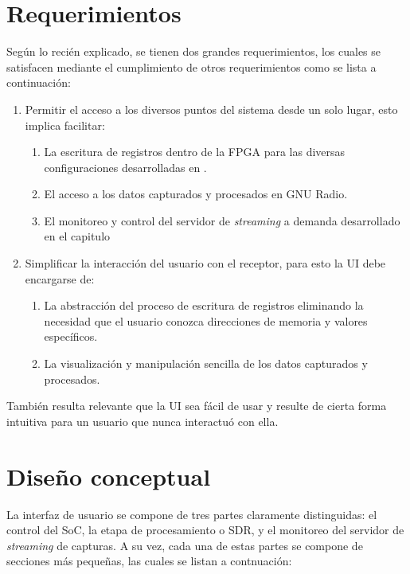 \documentclass[../../main.tex]{subfiles}
\begin{document}
\section{Requerimientos}
Según lo recién explicado, se tienen dos grandes requerimientos, los cuales se satisfacen mediante el cumplimiento de otros requerimientos como se lista a continuación:
\begin{enumerate}
    \item Permitir el acceso a los diversos puntos del sistema desde un solo lugar, esto implica facilitar:
    \begin{enumerate}
        \item La escritura de registros dentro de la FPGA para las diversas configuraciones desarrolladas en .
        \item El acceso a los datos capturados y procesados en GNU Radio.
        \item El monitoreo y control del servidor de \textit{streaming} a demanda desarrollado en el capitulo 
    \end{enumerate}
    \item Simplificar la interacción del usuario con el receptor, para esto la UI debe encargarse de:
    \begin{enumerate}
        \item La abstracción del proceso de escritura de registros eliminando la necesidad que el usuario conozca direcciones de memoria y valores específicos.
        \item La visualización y manipulación sencilla de los datos capturados y procesados.
    \end{enumerate}
\end{enumerate}

También resulta relevante que la UI sea fácil de usar y resulte de cierta forma intuitiva para un usuario que nunca interactuó con ella.

\section{Diseño conceptual}\label{sec::disenio-conceptual}
La interfaz de usuario se compone de tres partes claramente distinguidas: el control del SoC, la etapa de procesamiento o SDR, y el monitoreo del servidor de \textit{streaming} de capturas. A su vez, cada una de estas partes se compone de secciones más pequeñas, las cuales se listan a contnuación:
\end{document}
